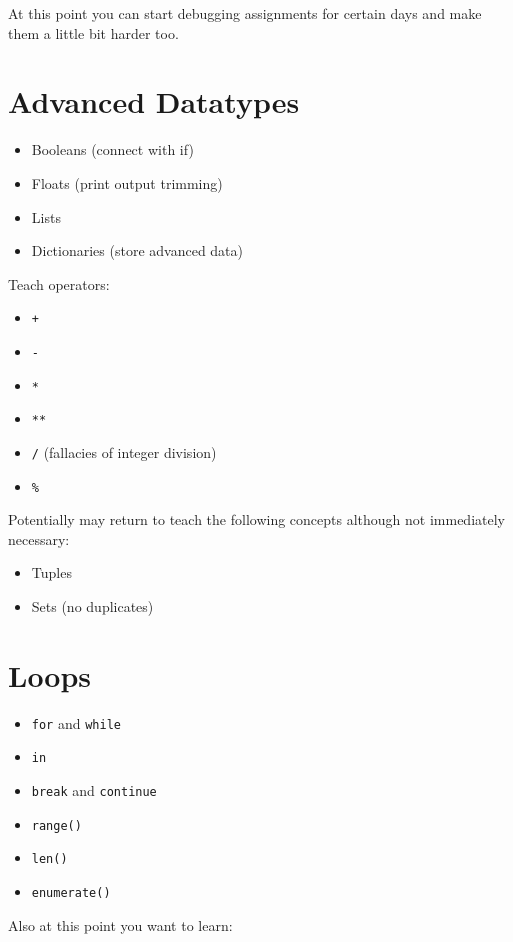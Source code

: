 \documentclass{article}
\begin{document}
At this point you can start debugging assignments for certain days and make them a little bit harder too.

\section{Advanced Datatypes}

\begin{itemize}
    \item Booleans (connect with if)
    \item Floats (print output trimming)
    \item Lists
    \item Dictionaries (store advanced data)
\end{itemize}

Teach operators:
\begin{itemize}
    \item \verb|+|
    \item \verb|-|
    \item \verb|*|
    \item \verb|**|
    \item \verb|/| (fallacies of integer division)
    \item \verb|%|
\end{itemize}

Potentially may return to teach the following concepts although not immediately necessary:

\begin{itemize}
    \item Tuples
    \item Sets (no duplicates)
\end{itemize}

\section{Loops}

\begin{itemize}
    \item \verb|for| and \verb|while|
    \item \verb|in|
    \item \verb|break| and \verb|continue|
    \item \verb|range()|
    \item \verb|len()|
    \item \verb|enumerate()| 
\end{itemize}

Also at this point you want to learn:
\end{document}
